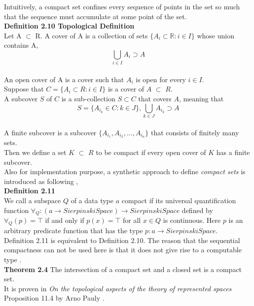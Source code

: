 \documentclass[12pt,twoside,notitlepage]{report}
\begin{document}
Intuitively, a compact set confines every sequence of points in the set so much that the sequence must accumulate at some point of the set. \\
\textbf{Definition 2.10 Topological Definition} \cite{john}\\
Let A $\subset$ R. A cover of A is a collection of sets $\{ A_i \subset \mathbb{R} : i \in I\}$ whose union contains A,\\
\begin{equation}
\bigcup_{i \in I} A_i \supset A
\end{equation}\\
An open cover of A is a cover such that $A_i$ is open for every $i \in I$.\\
Suppose that $C =\{A_i \subset R : i \in I\}$ is a cover of $A$ $\subset$ $R$. \\
A subcover $S$ of $C$ is a sub-collection $S \subset C$ that covers $A$, meaning that\\ 
\begin{equation}
S = \{A_{i_k} \in C : k \in J\},  \bigcup_{k \in J} A_{i_k} \supset A
\end{equation}\\
A finite subcover is a subcover $\{A_{i_1}, A_{i_2},...,A_{i_n}\}$ that consists of finitely many sets.\\
Then we define a set $K$ $\subset$ $R$ to be compact if every open cover of $K$ has a finite subcover.\\

Also for implementation purpose, a synthetic approach to define \emph{compact sets} is introduced as following \cite{escardo},\\
\textbf{Definition 2.11} \cite{escardo}\\
We call a subspace $Q$ of a data type $a$ compact if its universal quantification function $\forall_{Q} : (a \to Sierpinski Space) \to Sierpinski Space$ defined by\\
$\forall_{Q}(p) = \top$ if and only if $p(x) = \top$ for all $x \in Q$ is continuous. Here $p$ is an arbitrary predicate function that has the type $p : a \to Sierpinski Space$.\\

Definition 2.11 is equivalent to Definition 2.10. The reason that the sequential compactness can not be used here is that it does not give rise to a computable type \cite{gherardi4}.\\
\textbf{Theorem 2.4} The intersection of a compact set and a closed set is a compact set.\\
It is proven in \textit{On the topological aspects of the theory of represented spaces} Proposition 11.4 by Arno Pauly \cite{pauly-synthetic-arxiv}. 
\end{document}
